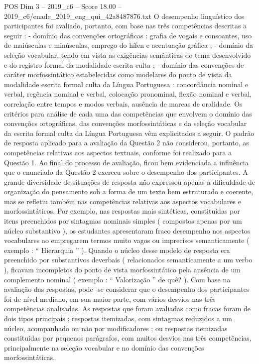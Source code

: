 \begin{textsample}{POS Dim 3 – 2019\_c6 – Score 18.00 – 2019\_c6/enade\_2019\_eng\_qui\_42a8487876.txt}
O desempenho linguístico dos participantes foi avaliado, portanto, com base nas três competências descritas a seguir : - domínio das convenções ortográficas : grafia de vogais e consoantes, uso de maiúsculas e minúsculas, emprego do hífen e acentuação gráfica ; - domínio da seleção vocabular, tendo em vista as exigências semânticas do tema desenvolvido e do registro formal da modalidade escrita culta ; - domínio das convenções de caráter morfossintático estabelecidas como modelares do ponto de vista da modalidade escrita formal culta da Língua Portuguesa : concordância nominal e verbal, regência nominal e verbal, colocação pronominal, flexão nominal e verbal, correlação entre tempos e modos verbais, ausência de marcas de oralidade.
Os critérios para análise de cada uma das competências que envolvem o domínio das convenções ortográficas, das convenções morfossintáticas e da seleção vocabular da escrita formal culta da Língua Portuguesa vêm explicitados a seguir.
O padrão de resposta aplicado para a avaliação da Questão 2 não considerou, portanto, as competências relativas aos aspectos textuais, conforme foi realizado para a Questão 1.
Ao final do processo de avaliação, ficou bem evidenciada a influência que o enunciado da Questão 2 exerceu sobre o desempenho dos participantes.
A grande diversidade de situações de resposta não expressou apenas a dificuldade de organização do pensamento sob a forma de um texto bem estruturado e coerente, mas se refletiu também nas competências relativas aos aspectos vocabulares e morfossintáticos.
Por exemplo, nas respostas mais sintéticas, constituídas por itens preenchidos por sintagmas nominais simples ( compostos apenas por um núcleo substantivo ), os estudantes apresentaram fraco desempenho nos aspectos vocabulares ao empregarem termos muito vagos ou imprecisos semanticamente ( exemplo : “ Hierarquia ” ).
Quando o núcleo desse modelo de resposta era preenchido por substantivos deverbais ( relacionados semanticamente a um verbo ), ficavam incompletos do ponto de vista morfossintático pela ausência de um complemento nominal ( exemplo : “ Valorização ” de quê? ).
Com base na avaliação das respostas, pode -se considerar que o desempenho dos participantes foi de nível mediano, em sua maior parte, com vários desvios nas três competências analisadas.
As respostas que foram avaliadas como fracas foram de dois tipos principais : respostas itemizadas, com sintagmas reduzidos a um núcleo, acompanhado ou não por modificadores ; ou respostas itemizadas constituídas por pequenos parágrafos, com muitos desvios nas três competências, principalmente na seleção vocabular e no domínio das convenções morfossintáticas.

\end{textsample}
